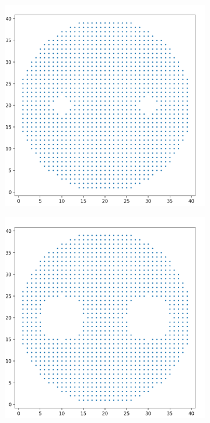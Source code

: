 \documentclass[10pt]{article}
\begin{document}
\begin{figure}[H]
    \begin{subfigure}[h]{0.2\textwidth}
        \includegraphics[width=\linewidth]{mh_5}
    \end{subfigure}
    \begin{subfigure}[h]{0.2\textwidth}
        \includegraphics[width=\linewidth]{mh_6}

\end{subfigure}
\end{figure}
\end{document}
